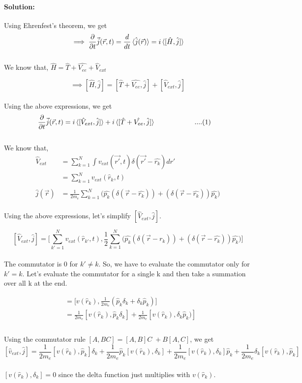 \documentclass[12pt]{article}
\begin{document}
\paragraph{Solution:}
Using Ehrenfest's theorem, we get
\[ \implies \frac{\partial}{\partial t}\vec{j}(\vec{r},t) = \frac{d}{dt} \braket{\hat{j}(\vec{r})} = 
i \braket{[\hat{H},\hat{j}]} \]
\\
We know that, $\hat{H} = \hat{T} +\hat{V_{ee}} + \hat{V}_{ext} $

 \[ \implies [\hat{H},\hat{j}] = [\hat{T}+\hat{V_{ee}},\hat{j}] + [\hat{V}_{ext},\hat{j}] \]
\\
Using the above expressions, we get
\begin{align*}
    \frac{\partial}{\partial t}\vec{j}(\vec{r},t) &= i\braket{[\hat{V}_{ext},\hat{j}]} + 
    i\braket{[\hat{T}+\hat{V_{ee}},\hat{j}]} \hspace{2cm} ....(1)
\end{align*} 
\\
We know that,
\begin{align*}
    \hat{V}_{ext} &= \sum_{k=1}^{N} \int v_{ext}(\vec{r'},t) \delta(\vec{r'} - \hat{r_k}) dr' \\
    &= \sum_{k=1}^{N} v_{ext}(\hat{r}_k,t)  \\
    \\
   \hat{j}(\vec{r}) &= \frac{1}{2 m_e} \sum_{k=1}^{N} \Big(\hat{p_k}(\delta(\vec{r} - \hat{r_k})) + 
   (\delta(\vec{r} - \hat{r_k}))\hat{p_k} \Big)
\end{align*}
\\
Using the above expressions, let's simplify $[\hat{V}_{ext},\hat{j}]$.

\[ [\hat{V}_{ext},\hat{j}] = \Big[ \sum_{k'=1}^{N} v_{ext}(\hat{r}_{k'},t) , \frac{1}{2} \sum_{k=1}^{N} 
\Big(\hat{p_k}(\delta(\vec{r} - \hat{r_k})) + (\delta(\vec{r} - \hat{r_k}))\hat{p_k} \Big) \Big]\]
\\
The commutator is 0 for $k' \neq k$. So, we have to evaluate the commutator only for $k' = k$. Let's evaluate the 
commutator for a single k and then take a summation over all k at the end.  

\begin{align*}
    [\hat{v}_{ext},\hat{j}] &= \big[ v(\hat{r}_k) , \frac{1}{2 m_e}(\hat{p}_k \delta_k + \delta_k \hat{p}_k) \big] \\
    &= \frac{1}{2 m_e} [v(\hat{r}_k), \hat{p}_k \delta_k ] + \frac{1}{2 m_e} [v(\hat{r}_k), \delta_k \hat{p}_k) ] \\
\end{align*}
\\
Using the commutator rule $[A,BC] = [A,B]C \; + B[A,C] $, we get
\[ [\hat{v}_{ext},\hat{j}] = \frac{1}{2 m_e} [v(\hat{r}_k), \hat{p}_k ]\delta_k  + \frac{1}{2 m_e} \hat{p}_k 
[v(\hat{r}_k),  \delta_k ] + \frac{1}{2 m_e} [v(\hat{r}_k), \delta_k ] \hat{p}_k  + \frac{1}{2 m_e} \delta_k [v(\hat{r}_k), 
\hat{p}_k ] \]
\\
$[v(\hat{r}_k),  \delta_k ] = 0$ since the delta function just multiplies with $v(\hat{r}_k)$. 
\end{document}
